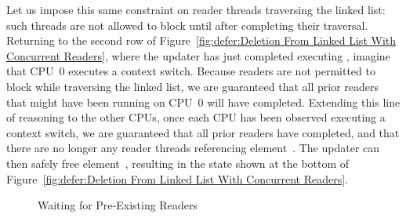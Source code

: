 Let us impose this same constraint on reader threads traversing the
linked list: such threads are not allowed to block until after
completing their traversal.
Returning to the second row of
Figure~\ref{fig:defer:Deletion From Linked List With Concurrent Readers},
where the updater has just completed executing ,
imagine that CPU~0 executes a context switch.
Because readers are not permitted to block while traversing the linked
list, we are guaranteed that all prior readers that might have been running on
CPU~0 will have completed.
Extending this line of reasoning to the other CPUs, once each CPU has
been observed executing a context switch, we are guaranteed that all
prior readers have completed, and that there are no longer any reader
threads referencing element~.
The updater can then safely free element~, resulting in the
state shown at the bottom of
Figure~\ref{fig:defer:Deletion From Linked List With Concurrent Readers}.
\fi

\begin{figure}[tb]
\begin{center}
\end{center}
\caption{Waiting for Pre-Existing Readers}
\label{fig:defer:Waiting for Pre-Existing Readers}
\end{figure}

